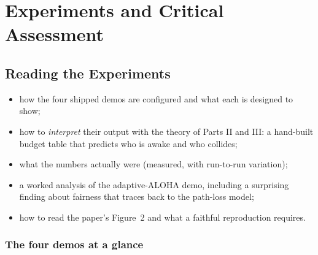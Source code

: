 \part{Experiments and Critical Assessment}

\chapter{Reading the Experiments}
\label{ch:experiments}

\begin{defbox}
\begin{itemize}
 \item how the four shipped demos are configured and what each is designed to show;
 \item how to \emph{interpret} their output with the theory of Parts II and III: a hand-built budget table that predicts who is awake and who collides;
 \item what the numbers actually were (measured, with run-to-run variation);
 \item a worked analysis of the adaptive-ALOHA demo, including a surprising finding about fairness that traces back to the path-loss model;
 \item how to read the paper's Figure~2 and what a faithful reproduction requires.
\end{itemize}
\end{defbox}

\section{The four demos at a glance}
\label{sec:demoglance}

